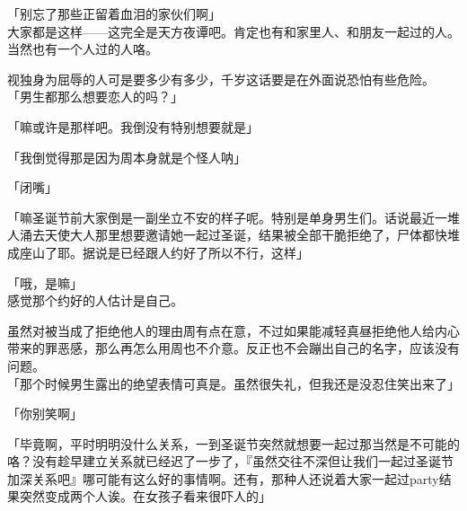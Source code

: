 「别忘了那些正留着血泪的家伙们啊」\\

大家都是这样——这完全是天方夜谭吧。肯定也有和家里人、和朋友一起过的人。当然也有一个人过的人咯。

视独身为屈辱的人可是要多少有多少，千岁这话要是在外面说恐怕有些危险。\\

「男生都那么想要恋人的吗？」

「嘛或许是那样吧。我倒没有特别想要就是」

「我倒觉得那是因为周本身就是个怪人呐」

「闭嘴」

「嘛圣诞节前大家倒是一副坐立不安的样子呢。特别是单身男生们。话说最近一堆人涌去天使大人那里想要邀请她一起过圣诞，结果被全部干脆拒绝了，尸体都快堆成座山了耶。据说是已经跟人约好了所以不行，这样」

「哦，是嘛」\\

感觉那个约好的人估计是自己。

虽然对被当成了拒绝他人的理由周有点在意，不过如果能减轻真昼拒绝他人给内心带来的罪恶感，那么再怎么用周也不介意。反正也不会蹦出自己的名字，应该没有问题。\\

「那个时候男生露出的绝望表情可真是。虽然很失礼，但我还是没忍住笑出来了」

「你别笑啊」

「毕竟啊，平时明明没什么关系，一到圣诞节突然就想要一起过那当然是不可能的咯？没有趁早建立关系就已经迟了一步了，『虽然交往不深但让我们一起过圣诞节加深关系吧』哪可能有这么好的事情啊。还有，那种人还说着大家一起过party结果突然变成两个人诶。在女孩子看来很吓人的」\\

